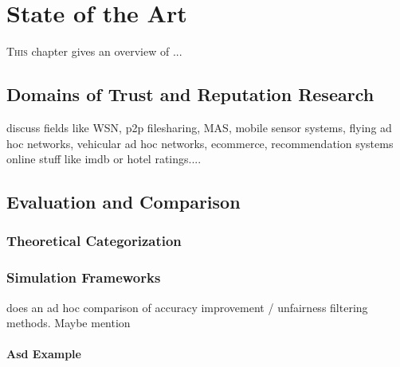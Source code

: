 \documentclass[%
    ]{\PathToTumTemplate/thesis/tum_thesis}
\begin{document}
\chapter{State of the Art}\label{chap:sota}

\lettrine{T}{his} chapter gives an overview of ... 


\section{Domains of Trust and Reputation Research}

discuss fields like WSN, p2p filesharing, MAS, mobile sensor systems, flying ad hoc networks, vehicular ad hoc networks, ecommerce, recommendation systems online stuff like imdb or hotel ratings....


\section{Evaluation and Comparison}\label{sec:sota_eval}

\subsection{Theoretical Categorization}

\subsection{Simulation Frameworks}


\cite{zhang_detailed_2008} does an ad hoc comparison of accuracy improvement / unfairness filtering methods. Maybe mention


\subsubsection{Asd Example}



\end{document}

